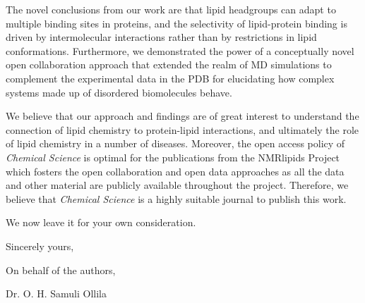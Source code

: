 \documentclass[11pt]{letter}
\begin{document}
The novel conclusions from our work are that lipid headgroups can adapt to multiple binding sites in proteins,
and the selectivity of lipid-protein binding is driven by intermolecular interactions rather than by restrictions in lipid conformations.
Furthermore, we demonstrated the power of a conceptually novel open collaboration approach that extended the realm of MD simulations to complement the experimental data in the PDB for elucidating how complex systems made up of disordered biomolecules behave.

We believe that our approach and findings are of great interest to understand the connection of lipid chemistry to protein-lipid interactions, and ultimately the role of lipid chemistry in a number of diseases. Moreover, the open access policy of {\it Chemical Science} is optimal for the publications from the NMRlipids Project which fosters the open collaboration and open data approaches as all the data and other material are publicly available throughout the project. Therefore, we believe that \textit{Chemical Science} is a highly suitable journal to publish this work.   

We now leave it for your own consideration.

Sincerely yours,

On behalf of the authors,

Dr. O. H. Samuli Ollila
\end{document}
